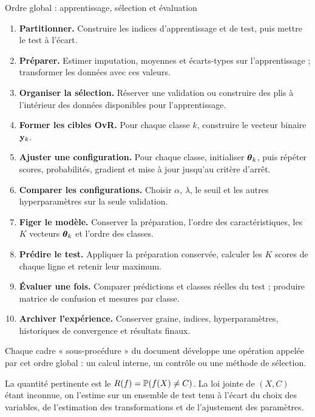 \begin{workflow}{Ordre global : apprentissage, sélection et évaluation}
\begin{enumerate}
  \item \textbf{Partitionner.} Construire les indices d'apprentissage et de test,
        puis mettre le test à l'écart.
  \item \textbf{Préparer.} Estimer imputation, moyennes et écarts-types sur
        l'apprentissage ; transformer les données avec ces valeurs.
  \item \textbf{Organiser la sélection.} Réserver une validation ou construire
        des plis à l'intérieur des données disponibles pour l'apprentissage.
  \item \textbf{Former les cibles OvR.} Pour chaque classe $k$, construire le
        vecteur binaire $\mathbf{y}_k$.
  \item \textbf{Ajuster une configuration.} Pour chaque classe, initialiser
        $\boldsymbol{\theta}_k$, puis répéter scores, probabilités, gradient et mise à jour
        jusqu'au critère d'arrêt.
  \item \textbf{Comparer les configurations.} Choisir $\alpha$, $\lambda$, le
        seuil et les autres hyperparamètres sur la seule validation.
  \item \textbf{Figer le modèle.} Conserver la préparation, l'ordre des
        caractéristiques, les $K$ vecteurs $\boldsymbol{\theta}_k$ et l'ordre des classes.
  \item \textbf{Prédire le test.} Appliquer la préparation conservée, calculer
        les $K$ scores de chaque ligne et retenir leur maximum.
  \item \textbf{Évaluer une fois.} Comparer prédictions et classes réelles du
        test ; produire matrice de confusion et mesures par classe.
  \item \textbf{Archiver l'expérience.} Conserver graine, indices,
        hyperparamètres, historiques de convergence et résultats finaux.
\end{enumerate}
\end{workflow}

Chaque cadre « sous-procédure » du document développe une opération appelée par
cet ordre global : un calcul interne, un contrôle ou une méthode de sélection.

\begin{resultat}
La quantité pertinente est le 
$R(f)=\mathbb{P}(f(X)\neq C)$. La loi jointe de $(X,C)$ étant inconnue, on l'estime sur
un ensemble de test tenu à l'écart du choix des variables, de l'estimation des
transformations et de l'ajustement des paramètres.
\end{resultat}

